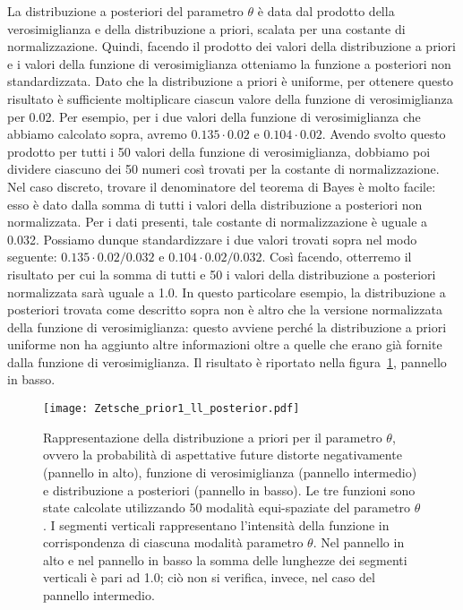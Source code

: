 La distribuzione a posteriori del parametro $\theta$ è data dal prodotto della verosimiglianza e della distribuzione a priori, scalata per una costante di normalizzazione.
Quindi, facendo il prodotto dei valori della distribuzione a priori e i valori della funzione di verosimiglianza otteniamo la funzione a posteriori non standardizzata. 
Dato che la distribuzione a priori è uniforme, per ottenere questo risultato è sufficiente moltiplicare ciascun valore della funzione di verosimiglianza per 0.02.
Per esempio, per i due valori della funzione di verosimiglianza che abbiamo calcolato sopra, avremo $0.135 \cdot 0.02$ e $0.104 \cdot 0.02$.
Avendo svolto questo prodotto per tutti i 50 valori della funzione di verosimiglianza, dobbiamo poi dividere ciascuno dei 50 numeri così trovati per la costante di normalizzazione.
Nel caso discreto, trovare il denominatore del teorema di Bayes è molto facile: esso è 
dato dalla somma di tutti i valori della distribuzione a posteriori non normalizzata.
Per i dati presenti, tale costante di normalizzazione è uguale a 0.032.
Possiamo dunque standardizzare i due valori trovati sopra nel modo seguente: $0.135 \cdot 0.02 / 0.032$ e $0.104 \cdot 0.02 / 0.032$.
Così facendo, otterremo il risultato per cui la somma di tutti e 50 i valori della distribuzione a posteriori normalizzata sarà uguale a 1.0.
In questo particolare esempio, la distribuzione a posteriori trovata come descritto sopra non è altro che la versione normalizzata della funzione di verosimiglianza: questo avviene perché la distribuzione a priori uniforme non ha aggiunto altre informazioni oltre a quelle che erano già fornite dalla funzione di verosimiglianza.
Il risultato è riportato nella figura~\ref{fig:Zetsche_prior1_ll_posterior}, pannello in basso.

\begin{figure}[h!]
 \centering
 \texttt{[image: Zetsche\_prior1\_ll\_posterior.pdf]}
 \caption{Rappresentazione della distribuzione a priori per il parametro $\theta$, ovvero la probabilità di aspettative future distorte negativamente \citep{zetsche_future_2019} (pannello in alto), funzione di verosimiglianza (pannello intermedio) e distribuzione a posteriori (pannello in basso). 
Le tre funzioni sono state calcolate utilizzando 50 modalità equi-spaziate del parametro $\theta$. 
I segmenti verticali rappresentano l'intensità della funzione in corrispondenza di ciascuna modalità parametro $\theta$. 
Nel pannello in alto e nel pannello in basso la somma delle lunghezze dei segmenti verticali è pari ad 1.0; ciò non si verifica, invece, nel caso del pannello intermedio.}
 \label{fig:Zetsche_prior1_ll_posterior}
 \end{figure}

